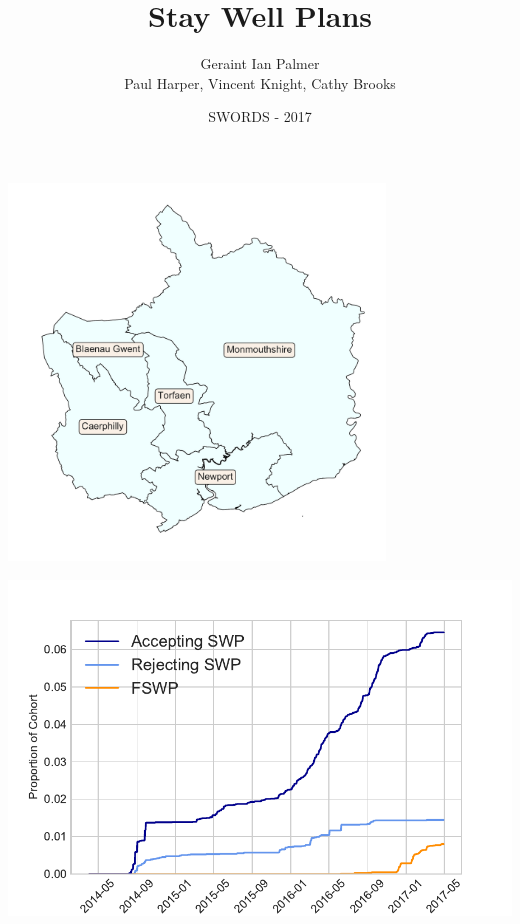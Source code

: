 \documentclass{beamer}
\title
{Stay Well Plans}
\author{Geraint Ian Palmer\\\footnotesize{Paul Harper, Vincent Knight, Cathy Brooks}}
\date{SWORDS - 2017}
\begin{document}
\frame{\titlepage}

\begin{frame}
\begin{center}
\vspace{6mm}
\includegraphics[width=0.75\textwidth]{counties_map}
\end{center}
\end{frame}

\begin{frame}
\begin{center}
\includegraphics[width=\textwidth]{SWP_trend}
\end{center}
\end{frame}

\begin{frame}
\begin{center}

\end{center}
\end{frame}
\end{document}
